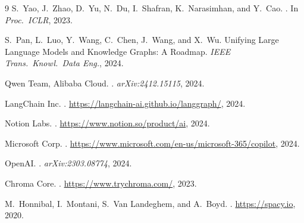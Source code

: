 \documentclass[10pt,twocolumn]{article}
\begin{document}
\begin{thebibliography}{9}
\small
{}
S.~Yao, J.~Zhao, D.~Yu, N.~Du, I.~Shafran, K.~Narasimhan, and Y.~Cao.
.
\newblock In \emph{Proc.\ ICLR}, 2023.

S.~Pan, L.~Luo, Y.~Wang, C.~Chen, J.~Wang, and X.~Wu.
\newblock Unifying Large Language Models and Knowledge Graphs: A Roadmap.
\newblock \emph{IEEE Trans.\ Knowl.\ Data Eng.}, 2024.

Qwen Team, Alibaba Cloud.
.
\newblock \emph{arXiv:2412.15115}, 2024.

LangChain Inc.
.
\newblock \url{https://langchain-ai.github.io/langgraph/}, 2024.

Notion Labs.
.
\newblock \url{https://www.notion.so/product/ai}, 2024.

Microsoft Corp.
.
\newblock \url{https://www.microsoft.com/en-us/microsoft-365/copilot}, 2024.

OpenAI.
.
\newblock \emph{arXiv:2303.08774}, 2024.

Chroma Core.
.
\newblock \url{https://www.trychroma.com/}, 2023.

M.~Honnibal, I.~Montani, S.~Van Landeghem, and A.~Boyd.
.
\newblock \url{https://spacy.io}, 2020.
\end{thebibliography}
\end{document}
